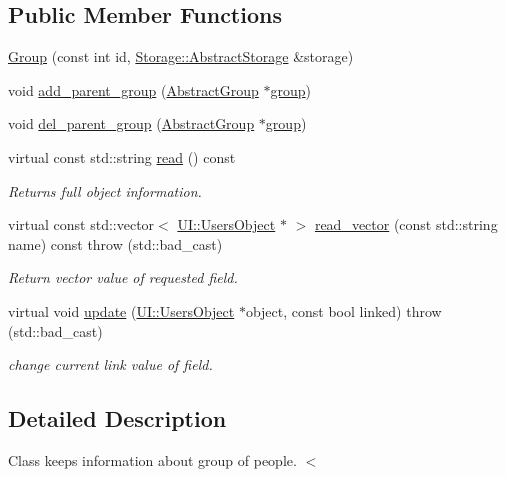 \subsection*{Public Member Functions}
\begin{DoxyCompactItemize}
\item 
\hyperlink{classCore_1_1Group_a39511a091570283cb5fb2a4b8f0a841a}{Group} (const int id, \hyperlink{classStorage_1_1AbstractStorage}{Storage::AbstractStorage} \&storage)
\item 
void \hyperlink{classCore_1_1Group_a05760e4e45ae6fec2674d216f0a5a6e9}{add\_\-parent\_\-group} (\hyperlink{classCore_1_1AbstractGroup}{AbstractGroup} $\ast$\hyperlink{group__content_8h_a27517aa1480ab2d9bfe5d62e693b33eb}{group})
\item 
void \hyperlink{classCore_1_1Group_a93e4626dde0f84e68f1460e557daaed0}{del\_\-parent\_\-group} (\hyperlink{classCore_1_1AbstractGroup}{AbstractGroup} $\ast$\hyperlink{group__content_8h_a27517aa1480ab2d9bfe5d62e693b33eb}{group})
\item 
virtual const std::string \hyperlink{classCore_1_1Group_a5fe3fef1b6709f953e5487841d90bbb9}{read} () const 
\begin{DoxyCompactList}\small\item\em Returns full object information. \item\end{DoxyCompactList}\item 
virtual const std::vector$<$ \hyperlink{classUI_1_1UsersObject}{UI::UsersObject} $\ast$ $>$ \hyperlink{classCore_1_1Group_a52e48b1f92f6354b4e3a32d710b9c7b3}{read\_\-vector} (const std::string name) const   throw (std::bad\_\-cast)
\begin{DoxyCompactList}\small\item\em Return vector value of requested field. \item\end{DoxyCompactList}\item 
virtual void \hyperlink{classCore_1_1Group_a12d2636d65f1baea3666bb492320b5c1}{update} (\hyperlink{classUI_1_1UsersObject}{UI::UsersObject} $\ast$object, const bool linked)  throw (std::bad\_\-cast)
\begin{DoxyCompactList}\small\item\em change current link value of field. \item\end{DoxyCompactList}\end{DoxyCompactItemize}


\subsection{Detailed Description}
Class keeps information about group of people. $<$ 

